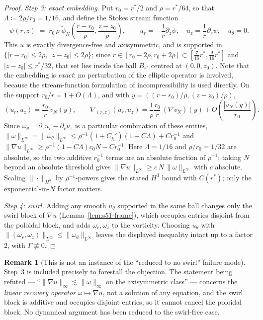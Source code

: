 \documentclass[11pt]{article}
\theoremstyle{definition}
\newtheorem{remark}[theorem]{Remark}
\theoremstyle{remark}
\providecommand{\colonequals}{\coloneqq}
\begin{document}
\begin{proof}
  \emph{Step 3: exact embedding.} Put $r_0=r^*/2$ and $\rho=r^*/64$, so that
  $\Lambda\colonequals2\rho/r_0=1/16$, and define the Stokes stream function
  \[
    \psi(r,z)\;=\;r_0\,\rho\;\tilde\phi_N\!\left(\frac{r-r_0}{\rho},
      \frac{z-z_0}{\rho}\right),
    \qquad
    u_r=-\frac1r\partial_z\psi,\quad u_z=\frac1r\partial_r\psi,\quad
    u_\theta=0 .
  \]
  This $u$ is exactly divergence-free and axisymmetric, and is supported in
  $\{|r-r_0|\leq2\rho,\ |z-z_0|\leq2\rho\}$; since
  $r\in[r_0-2\rho,r_0+2\rho]\subset[\tfrac{7}{16}r^*,\tfrac{9}{16}r^*]$ and
  $|z-z_0|\leq r^*/32$, that set lies inside the ball $B_{r^*}$ centred at
  $(0,0,z_0)$. Note that the embedding is \emph{exact}: no perturbation of
  the elliptic operator is involved, because the stream-function formulation
  of incompressibility is used directly. On the support
  $r_0/r=1+O(\Lambda)$, and with $y=((r-r_0)/\rho,(z-z_0)/\rho)$,
  \[
    (u_r,u_z)=\frac{r_0}{r}\,\tilde v_N(y),
    \qquad
    \nabla_{(r,z)}(u_r,u_z)
      =\frac{1}{\rho}\frac{r_0}{r}\,(\nabla\tilde v_N)(y)
      + O\!\left(\frac{|\tilde v_N(y)|}{r_0}\right).
  \]
  Since $\omega_\theta=\partial_zu_r-\partial_ru_z$ is a particular
  combination of these entries,
  $\|\omega\|_{L^\infty}=\|\omega_\theta\|_{L^\infty}
   \leq\rho^{-1}(1+C_\chi')(1+C\Lambda)+Cr_0^{-1}$ and
  $\|\nabla u\|_{L^\infty}\geq\rho^{-1}(1-C\Lambda)c_0N-Cr_0^{-1}$. Here
  $\Lambda=1/16$ and $\rho/r_0=1/32$ are absolute, so the two additive
  $r_0^{-1}$ terms are an absolute fraction of $\rho^{-1}$; taking $N$ beyond
  an absolute threshold gives
  $\|\nabla u\|_{L^\infty}\geq c\,N\,\|\omega\|_{L^\infty}$ with $c$
  absolute. Scaling $\|\cdot\|_{H^3}$ by $\rho^{-1}$-powers gives the stated
  $H^3$ bound with $C(r^*)$; only the exponential-in-$N$ factor matters.

  \emph{Step 4: swirl.} Adding any smooth $u_\theta$ supported in the same
  ball changes only the swirl block of $\nabla u$
  (Lemma~\ref{lem:s51-frame}), which occupies entries disjoint from the
  poloidal block, and adds $\omega_r,\omega_z$ to the vorticity. Choosing
  $u_\theta$ with $\|(\omega_r,\omega_z)\|_{L^\infty}
  \leq\|\omega_\theta\|_{L^\infty}$ leaves the displayed inequality intact up
  to a factor $2$, with $\Gamma\not\equiv0$.
\end{proof}

\begin{remark}[This is not an instance of the ``reduced to no swirl'' failure
  mode]\label{rem:s51-not-noswirl}
  Step~3 is included precisely to forestall the objection. The statement being
  refuted --- ``$\|\nabla u\|_\infty\lesssim\|\omega\|_\infty$ on the
  axisymmetric class'' --- concerns the \emph{linear recovery operator}
  $\omega\mapsto\nabla u$, not a solution of any equation, and the swirl block
  is additive and occupies disjoint entries, so it cannot cancel the poloidal
  block. No dynamical argument has been reduced to the swirl-free case.
\end{remark}
\end{document}
